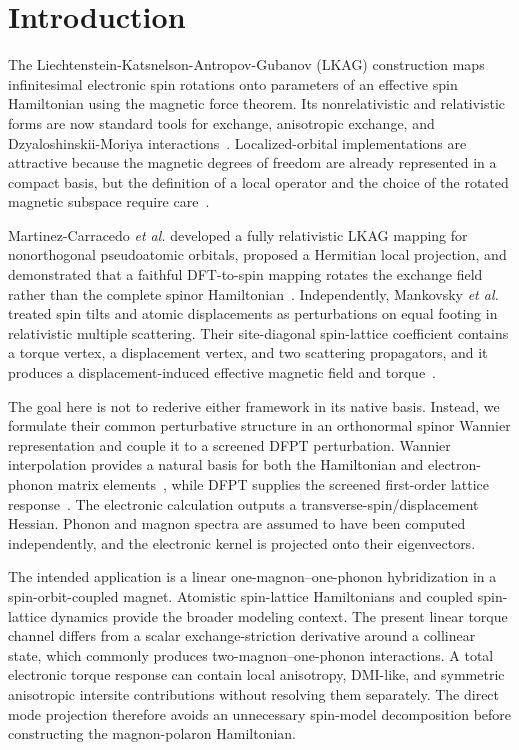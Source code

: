 \section{Introduction}
\label{sec:intro}

The Liechtenstein-Katsnelson-Antropov-Gubanov (LKAG) construction maps infinitesimal electronic spin rotations onto parameters of an effective spin Hamiltonian using the magnetic force theorem. Its nonrelativistic and relativistic forms are now standard tools for exchange, anisotropic exchange, and Dzyaloshinskii-Moriya interactions~\cite{Liechtenstein1987,Udvardi2003,EbertMankovsky2009,Szilva2023}. Localized-orbital implementations are attractive because the magnetic degrees of freedom are already represented in a compact basis, but the definition of a local operator and the choice of the rotated magnetic subspace require care~\cite{Oroszlany2019,SorianoPalacios2014,He2021TB2J}.

Martinez-Carracedo \emph{et al.} developed a fully relativistic LKAG mapping for nonorthogonal pseudoatomic orbitals, proposed a Hermitian local projection, and demonstrated that a faithful DFT-to-spin mapping rotates the exchange field rather than the complete spinor Hamiltonian~\cite{MartinezCarracedo2023}. Independently, Mankovsky \emph{et al.} treated spin tilts and atomic displacements as perturbations on equal footing in relativistic multiple scattering. Their site-diagonal spin-lattice coefficient contains a torque vertex, a displacement vertex, and two scattering propagators, and it produces a displacement-induced effective magnetic field and torque~\cite{Mankovsky2023SLC}.

The goal here is not to rederive either framework in its native basis. Instead, we formulate their common perturbative structure in an orthonormal spinor Wannier representation and couple it to a screened DFPT perturbation. Wannier interpolation provides a natural basis for both the Hamiltonian and electron-phonon matrix elements~\cite{Marzari2012,Giustino2007,Pizzi2020}, while DFPT supplies the screened first-order lattice response~\cite{Baroni2001}. The electronic calculation outputs a transverse-spin/displacement Hessian. Phonon and magnon spectra are assumed to have been computed independently, and the electronic kernel is projected onto their eigenvectors.

The intended application is a linear one-magnon--one-phonon hybridization in a spin-orbit-coupled magnet. Atomistic spin-lattice Hamiltonians and coupled spin-lattice dynamics provide the broader modeling context. The present linear torque channel differs from a scalar exchange-striction derivative around a collinear state, which commonly produces two-magnon--one-phonon interactions. A total electronic torque response can contain local anisotropy, DMI-like, and symmetric anisotropic intersite contributions without resolving them separately. The direct mode projection therefore avoids an unnecessary spin-model decomposition before constructing the magnon-polaron Hamiltonian.
